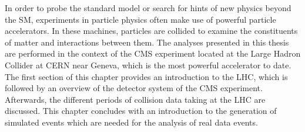 In order to probe the standard model or search for hints of new physics beyond the SM, experiments in particle physics often make use of powerful particle accelerators. In these machines, particles are collided to examine the constituents of matter and interactions between them. The analyses presented in this thesis are performed in the context of the CMS experiment located at the Large Hadron Collider at CERN near Geneva, which is the most powerful accelerator to date. \\ 
The first section of this chapter provides an introduction to the LHC, which is followed by an overview of the detector system of the CMS experiment. Afterwards, the different periods of collision data taking at the LHC are discussed. This chapter concludes with an introduction to the generation of simulated events which are needed for the analysis of real data events.  
